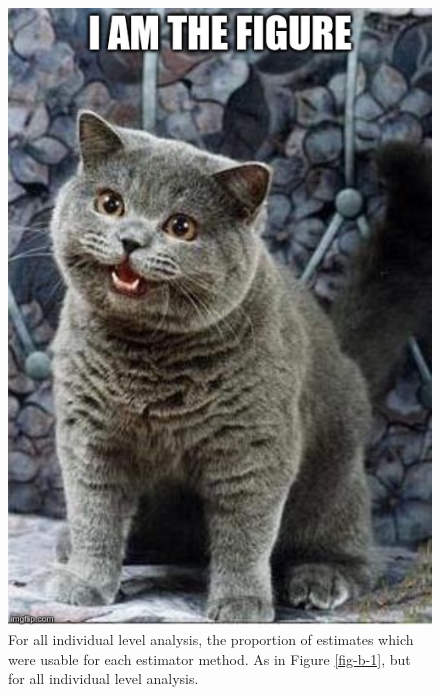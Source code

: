 \begin{figure}
	\centering
	\includegraphics[scale=0.5]{images/figure_filler.jpg}
	\caption[For all individual level analysis, the proportion of estimates which were usable for each estimator method]{For all individual level analysis, the proportion of estimates which were usable for each estimator method. As in Figure \ref{fig-b-1}, but for all individual level analysis.} \label{fig-b-2}
\end{figure}

